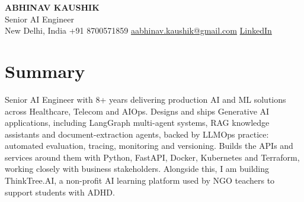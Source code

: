 \documentclass[10pt,a4paper]{article}
\begin{document}
\begin{center}
  {\LARGE\bfseries ABHINAV KAUSHIK}\\[2pt]
  {\large Senior AI Engineer}\\[2pt]
  New Delhi, India \textbar{} +91 8700571859 \textbar{} \href{mailto:aabhinav.kaushik@gmail.com}{aabhinav.kaushik@gmail.com} \textbar{} \href{https://www.linkedin.com/in/abhinav-kaushik10/}{LinkedIn}  
\end{center}

\section{Summary}
Senior AI Engineer with 8+ years delivering production AI and ML solutions across Healthcare, Telecom and AIOps. Designs and ships Generative AI applications, including LangGraph multi-agent systems, RAG knowledge assistants and document-extraction agents, backed by LLMOps practice: automated evaluation, tracing, monitoring and versioning. Builds the APIs and services around them with Python, FastAPI, Docker, Kubernetes and Terraform, working closely with business stakeholders. Alongside this, I am building ThinkTree.AI, a non-profit AI learning platform used by NGO teachers to support students with ADHD.
\end{document}
